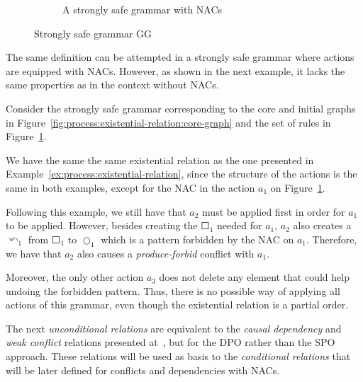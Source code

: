 \begin{example}
\begin{figure}[!ht]
\begin{subfigure}[t]{.5\textwidth}
    \caption{A strongly safe grammar with NACs}\label{fig:process:existential-relation:example-nacs}
  \end{subfigure}
  \caption{Strongly safe grammar GG}\label{fig:process:existential-relation}
\end{figure}
\end{example}

The same definition can be attempted in a strongly safe grammar where actions are equipped with NACs. However, as shown in the next example, it lacks the same properties as in the context without NACs.

\begin{example}\label{ex:process:existential-relation-fail}Consider the strongly safe grammar corresponding to the core and initial graphs in Figure~\ref{fig:process:existential-relation:core-graph} and the set of rules in Figure~\ref{fig:process:existential-relation:example-nacs}. 

  We have the same the same existential relation as the one presented in Example~\ref{ex:process:existential-relation}, since the structure of the actions is the same in both examples, except for the NAC in the action $a_1$ on Figure~\ref{fig:process:existential-relation:example-nacs}.

  Following this example, we still have that $a_2$ must be applied first in order for $a_1$ to be applied. However, besides creating the $\Square_1$ needed for $a_1$, $a_2$ also creates a $\curvearrowleft_1$ from $\Square_1$ to $\Circle_1$ which is a pattern forbidden by the NAC on $a_1$. Therefore, we have that $a_2$ also causes a \emph{produce-forbid} conflict with $a_1$.

  Moreover, the only other action $a_3$ does not delete any element that could help undoing the forbidden pattern. Thus, there is no possible way of applying all actions of this grammar, even though the existential relation is a partial order.

\end{example}

The next \emph{unconditional relations} are equivalent to the \emph{causal dependency} and \emph{weak conflict} relations presented at~\cite{Ribeiro1996}, but for the DPO rather than the SPO approach. These relations will be used as basis to the \emph{conditional relations} that will be later defined for conflicts and dependencies with NACs.

